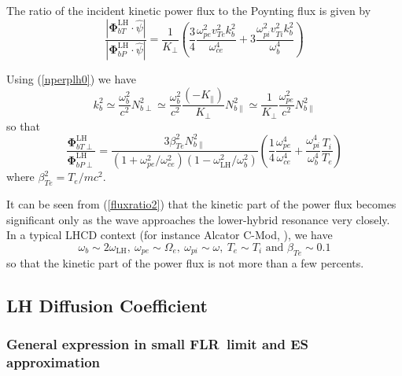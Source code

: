 The ratio of the incident kinetic power flux to the Poynting flux is given by
\begin{equation}
\frac{\left|  \mathbf{\Phi}_{bT}^{\text{LH}}\cdot\widehat{\psi}\right|
}{\left|  \mathbf{\Phi}_{bP}^{\text{LH}}\cdot\widehat{\psi}\right|  }=\frac
{1}{K_{\perp}}\left(  \frac{3}{4}\frac{\omega_{pe}^{2}v_{Te}^{2}k_{b}^{2}%
}{\omega_{ce}^{4}}+3\frac{\omega_{pi}^{2}v_{Ti}^{2}k_{b}^{2}}{\omega_{b}^{4}%
}\right)  \label{fluxratio}%
\end{equation}

Using ({\ref{nperplh0}) we have
\begin{equation}
k_{b}^{2}\simeq\frac{\omega_{b}^{2}}{c^{2}}N_{b\perp}^{2}\simeq\frac
{\omega_{b}^{2}}{c^{2}}\frac{\left(  -K_{\parallel}\right)  }{K_{\perp}%
}N_{b\parallel}^{2}\simeq\frac{1}{K_{\perp}}\frac{\omega_{pe}^{2}}{c^{2}%
}N_{b\parallel}^{2}%
\end{equation}
so that
\begin{equation}
\frac{\mathbf{\Phi}_{bT\perp}^{\text{LH}}}{\mathbf{\Phi}_{bP\perp}^{\text{LH}%
}}=\frac{3\beta_{Te}^{2}N_{b\parallel}^{2}}{(1+\omega_{pe}^{2}/\omega_{ce}%
^{2})(1-\omega_{\text{LH}}^{2}/\omega_{b}^{2})}\left(  \frac{1}{4}\frac
{\omega_{pe}^{4}}{\omega_{ce}^{4}}+\frac{\omega_{pi}^{4}}{\omega_{b}^{4}}%
\frac{T_{i}}{T_{e}}\right)  \label{fluxratio2}%
\end{equation}
where $\beta_{Te}^{2}=T_{e}/mc^{2}$. }

It can be seen from (\ref{fluxratio2}) that the kinetic part of the power flux
becomes significant only as the wave approaches the lower-hybrid resonance
very closely. In a typical LHCD context (for instance Alcator C-Mod,
\cite{bon00}), we have
\begin{equation}
\omega_{b}\sim2\omega_{\text{LH}},\ \omega_{pe}\sim\Omega_{e},\ \omega
_{pi}\sim\omega,\ T_{e}\sim T_{i}\text{ and }\beta_{Te}\sim0.1 \label{cmod}%
\end{equation}
so that the kinetic part of the power flux is not more than a few percents.

\subsection{LH Diffusion Coefficient}

\subsubsection{General expression in small FLR\ limit and ES approximation}

